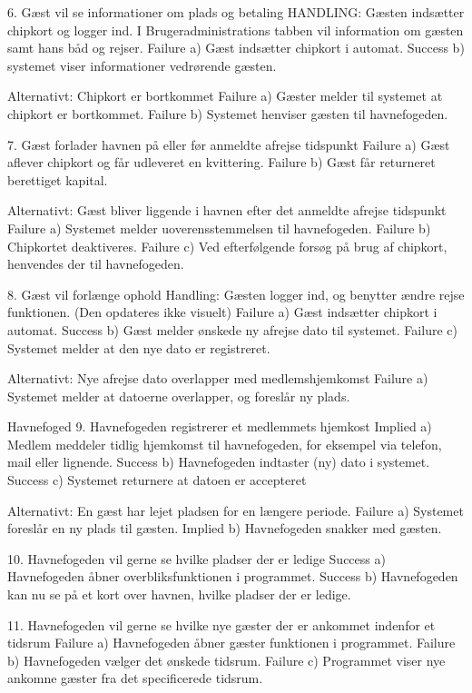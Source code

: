 6. Gæst vil se informationer om plads og betaling
		HANDLING: Gæsten indsætter chipkort og logger ind. I Brugeradministrations tabben vil information om gæsten samt hans båd og rejser.
			Failure a) Gæst indsætter chipkort i automat.
			Success b) systemet viser informationer vedrørende gæsten.
     
		Alternativt: Chipkort er bortkommet
			Failure a) Gæster melder til systemet at chipkort er bortkommet.
			Failure b) Systemet henviser gæsten til havnefogeden.
     
7. Gæst forlader havnen på eller før anmeldte afrejse tidspunkt
			Failure a) Gæst aflever chipkort og får udleveret en kvittering.
			Failure b) Gæst får returneret berettiget kapital.
    
		Alternativt: Gæst bliver liggende i havnen efter det anmeldte afrejse tidspunkt
			Failure a) Systemet melder uoverensstemmelsen til havnefogeden.
			Failure b) Chipkortet deaktiveres.
			Failure c) Ved efterfølgende forsøg på brug af chipkort, henvendes der til havnefogeden.
      
8. Gæst vil forlænge ophold
		Handling: Gæsten logger ind, og benytter ændre rejse funktionen. (Den opdateres ikke visuelt)
			Failure a) Gæst indsætter chipkort i automat.
			Success b) Gæst melder ønskede ny afrejse dato til systemet.
			Failure c) Systemet melder at den nye dato er registreret.
     
		Alternativt: Nye afrejse dato overlapper med medlemshjemkomst
			Failure a) Systemet melder at datoerne overlapper, og foreslår ny plads.
      
		Havnefoged
9. Havnefogeden registrerer et medlemmets hjemkost
			Implied a) Medlem meddeler tidlig hjemkomst til havnefogeden, for eksempel via telefon, mail eller lignende.
			Success b) Havnefogeden indtaster (ny) dato i systemet.
			Success c) Systemet returnere at datoen er accepteret

		Alternativt: En gæst har lejet pladsen for en længere periode.
			Failure a) Systemet foreslår en ny plads til gæsten.
			Implied b) Havnefogeden snakker med gæsten.
      
10. Havnefogeden vil gerne se hvilke pladser der er ledige
			Success a) Havnefogeden åbner overbliksfunktionen i programmet.
			Success b) Havnefogeden kan nu se på et kort over havnen, hvilke pladser der er ledige.
      
11. Havnefogeden vil gerne se hvilke nye gæster der er ankommet indenfor et tidsrum
			Failure a) Havnefogeden åbner gæster funktionen i programmet.
			Failure b) Havnefogeden vælger det ønskede tidsrum.
			Failure c) Programmet viser nye ankomne gæster fra det specificerede tidsrum.
  
